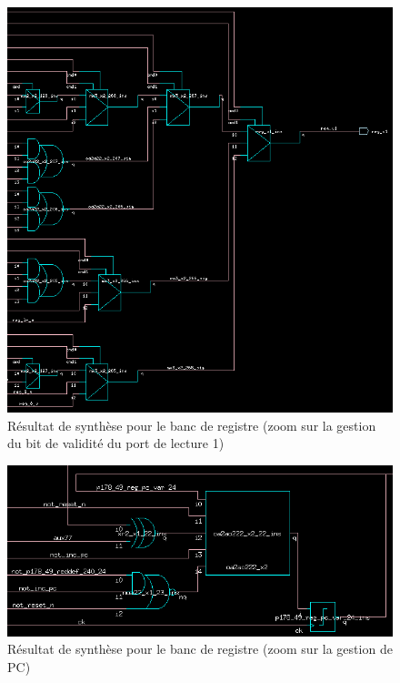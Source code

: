 \documentclass[10pt,a4paper]{article}
\begin{document}
			\begin{figure}[H]															%
				\centering 																%
				\includegraphics[width=1.0\textwidth]{reg_v1.png} 						%
				\caption{Résultat de synthèse pour le banc de registre  (zoom sur la gestion du bit de validité 							du port de lecture 1)}
				\label{Fig.main2} 														%
			\end{figure}

			\begin{figure}[H]															%
				\centering 																%
				\includegraphics[width=1.0\textwidth]{+4_pc.png} 							%
				\caption{Résultat de synthèse pour le banc de registre  (zoom sur la gestion de PC)}
				\label{Fig.main2} 														%
			\end{figure}
\end{document}
